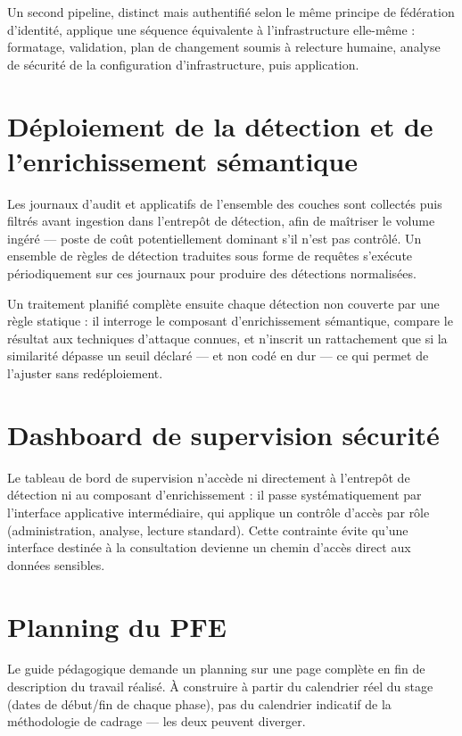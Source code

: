 Un second pipeline, distinct mais authentifié selon le même principe de fédération
d'identité, applique une séquence équivalente à l'infrastructure elle-même : formatage,
validation, plan de changement soumis à relecture humaine, analyse de sécurité de la
configuration d'infrastructure, puis application.

\section{Déploiement de la détection et de l'enrichissement sémantique}

Les journaux d'audit et applicatifs de l'ensemble des couches sont collectés puis filtrés
avant ingestion dans l'entrepôt de détection, afin de maîtriser le volume ingéré --- poste
de coût potentiellement dominant s'il n'est pas contrôlé. Un ensemble de règles de détection
traduites sous forme de requêtes s'exécute périodiquement sur ces journaux pour produire des
détections normalisées.

Un traitement planifié complète ensuite chaque détection non couverte par une règle
statique : il interroge le composant d'enrichissement sémantique, compare le résultat aux
techniques d'attaque connues, et n'inscrit un rattachement que si la similarité dépasse un
seuil déclaré --- et non codé en dur --- ce qui permet de l'ajuster sans redéploiement.

\section{Dashboard de supervision sécurité}

Le tableau de bord de supervision n'accède ni directement à l'entrepôt de détection ni au
composant d'enrichissement : il passe systématiquement par l'interface applicative
intermédiaire, qui applique un contrôle d'accès par rôle (administration, analyse, lecture
standard). Cette contrainte évite qu'une interface destinée à la consultation devienne un
chemin d'accès direct aux données sensibles.


\section{Planning du PFE}

\begin{attentedoc}
Le guide pédagogique demande un planning sur une page complète en fin de description du
travail réalisé. À construire à partir du calendrier réel du stage (dates de début/fin de
chaque phase), pas du calendrier indicatif de la méthodologie de cadrage --- les deux
peuvent diverger.
\end{attentedoc}

